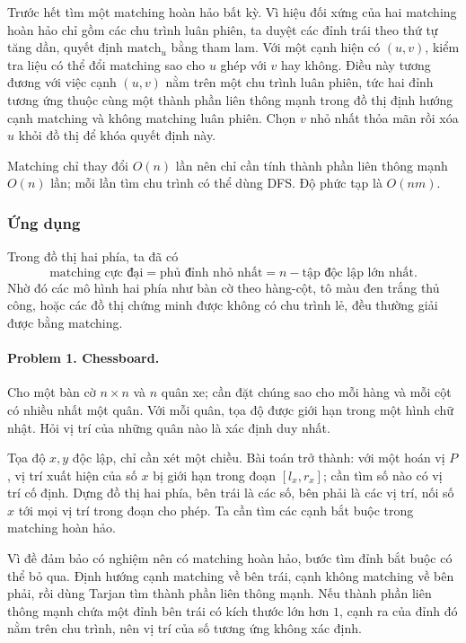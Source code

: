 \documentclass[11pt]{article}
\begin{document}
Trước hết tìm một matching hoàn hảo bất kỳ. Vì hiệu đối xứng của hai matching
hoàn hảo chỉ gồm các chu trình luân phiên, ta duyệt các đỉnh trái theo thứ tự
tăng dần, quyết định \(\mathrm{match}_u\) bằng tham lam. Với một cạnh hiện có
\((u,v)\), kiểm tra liệu có thể đổi matching sao cho \(u\) ghép với \(v\) hay
không. Điều này tương đương với việc cạnh \((u,v)\) nằm trên một chu trình
luân phiên, tức hai đỉnh tương ứng thuộc cùng một thành phần liên thông mạnh
trong đồ thị định hướng cạnh matching và không matching luân phiên. Chọn \(v\)
nhỏ nhất thỏa mãn rồi xóa \(u\) khỏi đồ thị để khóa quyết định này.

Matching chỉ thay đổi \(O(n)\) lần nên chỉ cần tính thành phần liên thông mạnh
\(O(n)\) lần; mỗi lần tìm chu trình có thể dùng DFS. Độ phức tạp là \(O(nm)\).

\subsubsection{Ứng dụng}

Trong đồ thị hai phía, ta đã có
\[
  \text{matching cực đại}
  =\text{phủ đỉnh nhỏ nhất}
  =n-\text{tập độc lập lớn nhất}.
\]
Nhờ đó các mô hình hai phía như bàn cờ theo hàng-cột, tô màu đen trắng thủ công,
hoặc các đồ thị chứng minh được không có chu trình lẻ, đều thường giải được bằng
matching.

\paragraph{Problem 1. Chessboard.}
Cho một bàn cờ \(n\times n\) và \(n\) quân xe; cần đặt chúng sao cho mỗi hàng và
mỗi cột có nhiều nhất một quân. Với mỗi quân, tọa độ được giới hạn trong một
hình chữ nhật. Hỏi vị trí của những quân nào là xác định duy nhất.

Tọa độ \(x,y\) độc lập, chỉ cần xét một chiều. Bài toán trở thành: với một hoán
vị \(P\), vị trí xuất hiện của số \(x\) bị giới hạn trong đoạn \([l_x,r_x]\);
cần tìm số nào có vị trí cố định. Dựng đồ thị hai phía, bên trái là các số, bên
phải là các vị trí, nối số \(x\) tới mọi vị trí trong đoạn cho phép. Ta cần tìm
các cạnh bắt buộc trong matching hoàn hảo.

Vì đề đảm bảo có nghiệm nên có matching hoàn hảo, bước tìm đỉnh bắt buộc có thể
bỏ qua. Định hướng cạnh matching về bên trái, cạnh không matching về bên phải,
rồi dùng Tarjan tìm thành phần liên thông mạnh. Nếu thành phần liên thông mạnh
chứa một đỉnh bên trái có kích thước lớn hơn \(1\), cạnh ra của đỉnh đó nằm trên
chu trình, nên vị trí của số tương ứng không xác định.
\end{document}
